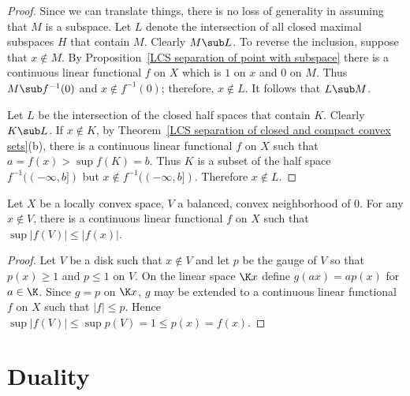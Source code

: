 \begin{proof}
Since we can translate things, there is no loss of generality in assuming that $M$ is a subspace. Let $L$ denote the intersection of all closed maximal subspaces $H$ that contain $M$. Clearly $M\sub L$. To reverse the inclusion, suppose that $x\notin M$. By Proposition~\ref{LCS separation of point with subspace} there is a continuous linear functional $f$ on $X$ which is $1$ on $x$ and $0$ on $M$. Thus $M\sub f^{-1}(0)$ and $x\notin f^{-1}(0)$; therefore, $x\notin L$. It follows that $L\sub M$.\par
Let $L$ be the intersection of the closed half spaces that contain $K$. Clearly $K\sub L$. If $x\notin K$, by Theorem~\ref{LCS separation of closed and compact convex sets}(b), there is a continuous linear functional $f$ on $X$ such that $a=f(x)>\sup f(K)=b$. Thus $K$ is a subset of the half space $f^{-1}((-\infty,b])$ but $x\notin f^{-1}((-\infty,b])$. Therefore $x\notin L$.
\end{proof}
\begin{proposition}\label{LCS not in disk functional}
Let $X$ be a locally convex space, $V$ a balanced, convex neighborhood of $0$. For any $x\notin V$, there is a continuous linear functional $f$ on $X$ such that $\sup|f(V)|\leq|f(x)|$.
\end{proposition}
\begin{proof}
Let $V$ be a disk such that $x\notin V$ and let $p$ be the gauge of $V$ so that $p(x)\geq 1$ and $p\leq 1$ on $V$. On the linear space $\K x$ define $g(ax)=ap(x)$ for $a\in\K$. Since $g=p$ on $\K x$, $g$ may be extended to a continuous linear functional $f$ on $X$ such that $|f|\leq p$. Hence $\sup|f(V)|\leq\sup p(V)=1\leq p(x)=f(x)$.
\end{proof}
\newpage
\chapter{Duality}
